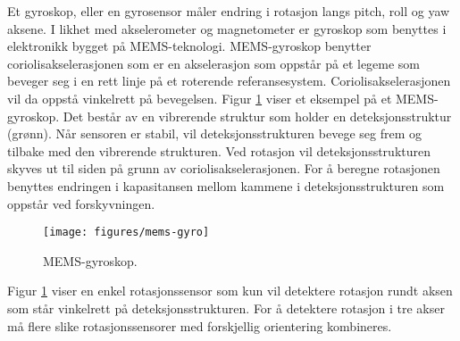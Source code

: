 Et gyroskop, eller en gyrosensor måler endring i rotasjon langs pitch, roll og yaw aksene. 
I likhet med akselerometer og magnetometer er gyroskop som benyttes i elektronikk bygget på MEMS-teknologi. 
MEMS-gyroskop benytter coriolisakselerasjonen som er en akselerasjon som oppstår på et legeme som 
beveger seg i en rett linje på et roterende referansesystem. Coriolisakselerasjonen vil da oppstå vinkelrett på bevegelsen. \parencite{Gron2021coriolis}
Figur \ref{fig:mems-gyro} viser et eksempel på et MEMS-gyroskop. Det består av en vibrerende struktur som holder en deteksjonsstruktur (grønn). 
Når sensoren er stabil, vil deteksjonsstrukturen bevege seg frem og tilbake med den vibrerende strukturen. 
Ved rotasjon vil deteksjonsstrukturen skyves ut til siden på grunn av coriolisakselerasjonen. 
For å beregne rotasjonen benyttes endringen i kapasitansen mellom kammene i deteksjonsstrukturen som oppstår ved forskyvningen. 

\begin{figure}[htp]
    \centering
    \texttt{[image: figures/mems-gyro]}
    \caption{MEMS-gyroskop. \parencite{Bosch}}
    \label{fig:mems-gyro}
\end{figure}

Figur \ref{fig:mems-gyro} viser en enkel rotasjonssensor som kun vil detektere rotasjon rundt 
aksen som står vinkelrett på deteksjonsstrukturen. For å detektere rotasjon i tre akser må 
flere slike rotasjonssensorer med forskjellig orientering kombineres. \parencite{Bosch}
